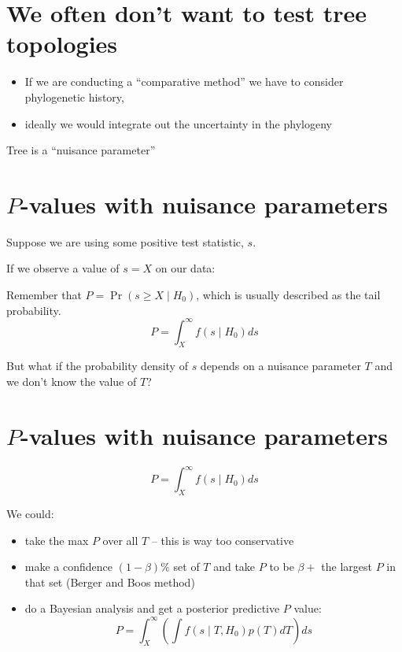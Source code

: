 
% 

\myNewSlide
\section*{We often don't want to test tree topologies}
\begin{itemize}
    \item If we are conducting a ``comparative method'' we have to consider phylogenetic history,
    \item ideally we would integrate out the uncertainty in the phylogeny
\end{itemize}

Tree is a  ``nuisance parameter''

\myNewSlide
\section*{$P$-values with nuisance parameters}
Suppose we are using some positive test statistic, $s$.

If we observe a value of $s=X$ on our data:

Remember that $P = \Pr(s \geq X \mid H_0)$, which
is usually described as the tail probability.
$$P = \int_X^\infty f(s\mid H_0) ds$$

But what if the probability density of $s$ depends on a nuisance
parameter $T$ and we don't know the value of $T$?

\myNewSlide
\section*{$P$-values with nuisance parameters}
$$P = \int_X^\infty f(s\mid H_0) ds$$

We could:
\begin{itemize}
    \item  take the max $P$ over all $T$ -- this is way too conservative
    \item make a confidence $(1-\beta)\%$ set of $T$ and take  $P$ to be $\beta +$ the largest $P$ in that set (Berger and Boos method)
    \item do a Bayesian analysis and get a posterior predictive $P$ value:
    $$ P = \int_X^\infty \left(\int f(s\mid T, H_0)p(T) dT \right)ds $$
\end{itemize}



